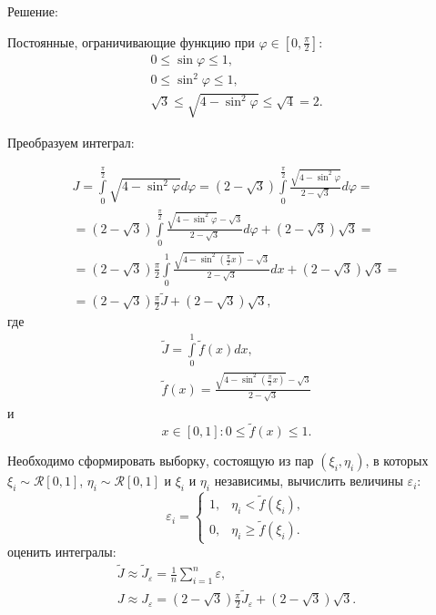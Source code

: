 \documentclass[a4paper,12pt]{article}
\begin{document}
Решение:

Постоянные, ограничивающие функцию при $\varphi \in \left[ 0, \frac{\pi}{2} \right]$:
\begin{gather*}
    0 \le \sin \varphi \le 1 , \\
    0 \le \sin^2 \varphi \le 1 , \\
    \sqrt{3} \le \sqrt{4 - \sin^2 \varphi} \le \sqrt{4} = 2 .
\end{gather*}

Преобразуем интеграл:

\begin{multline*}
    J
    = \int \limits_0^{\frac{\pi}{2}} \sqrt{4 - \sin^2 \varphi} d \varphi
    = \left( 2 - \sqrt{3} \right) \int \limits_0^{\frac{\pi}{2}} \frac{\sqrt{4 - \sin^2 \varphi}}{2 - \sqrt{3}} d \varphi = \\
    = \left( 2 - \sqrt{3} \right) \int \limits_0^{\frac{\pi}{2}} \frac{\sqrt{4 - \sin^2 \varphi} - \sqrt{3}}{2 - \sqrt{3}} d \varphi + \left( 2 - \sqrt{3} \right) \sqrt{3} = \\
    = \left( 2 - \sqrt{3} \right) \frac{\pi}{2} \int \limits_0^1 \frac{\sqrt{4 - \sin^2 \left( \frac{\pi}{2} x \right)} - \sqrt{3}}{2 - \sqrt{3}} d x + \left( 2 - \sqrt{3} \right) \sqrt{3} = \\
    = \left( 2 - \sqrt{3} \right) \frac{\pi}{2} \widetilde{J} + \left( 2 - \sqrt{3} \right) \sqrt{3} ,
\end{multline*}
где
\begin{gather*}
    \widetilde{J} = \int \limits_0^1 \widetilde{f}(x) d x , \\
    \widetilde{f}(x) = \frac{\sqrt{4 - \sin^2 \left( \frac{\pi}{2} x \right)} - \sqrt{3}}{2 - \sqrt{3}}
\end{gather*}
и
\[
    x \in [0, 1]: 0 \le \widetilde{f}(x) \le 1 .
\]

Необходимо сформировать выборку, состоящую из пар $(\xi_i, \eta_i)$, в которых $\xi_i \sim \mathcal{R}[0, 1]$, $\eta_i \sim \mathcal{R}[0, 1]$ и
$\xi_i$ и $\eta_i$ независимы, вычислить величины $\varepsilon_i$:
\[
    \varepsilon_i
    = \left \{
    \begin{array}{ll}
        1, & \eta_i < \widetilde{f}(\xi_i) , \\
        0, & \eta_i \ge \widetilde{f}(\xi_i) .
    \end{array}
    \right .
\]
оценить интегралы:
\begin{gather*}
    \widetilde{J} \approx \widetilde{J}_\varepsilon = \frac{1}{n} \sum_{i=1}^n \varepsilon , \\
    J \approx J_\varepsilon = \left( 2 - \sqrt{3} \right) \frac{\pi}{2} \widetilde{J}_\varepsilon + \left( 2 - \sqrt{3} \right) \sqrt{3} .
\end{gather*}
\end{document}
